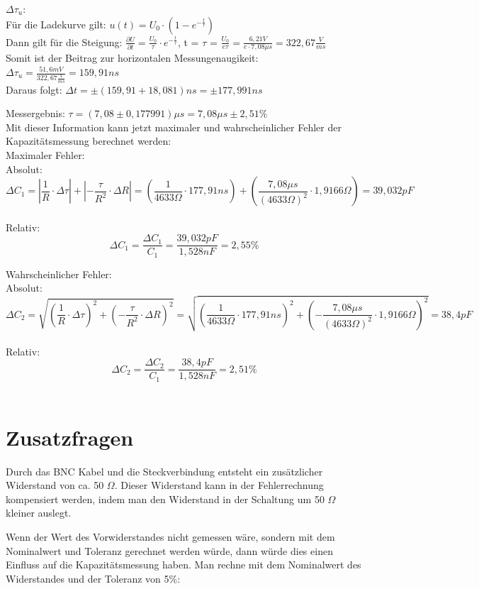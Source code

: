 $\Delta \tau_u$: \\
Für die Ladekurve gilt: $u(t) = U_0 \cdot (1 - e^{-\frac{t}{\tau}})$\\
Dann gilt für die Steigung: $\frac{\partial U}{\partial t} =\frac{U_0}{\tau} \cdot e^{-\frac{t}{\tau}}$, t = $\tau$ = $\frac{U_0}{e\tau} = \frac{6,21V}{e\cdot7,08\mu s} = 322,67\frac{V}{ms}$\\
Somit ist der Beitrag zur horizontalen Messungenaugikeit: $\Delta \tau_u = \frac{51,6mV}{322,67\frac{V}{ms}} = 159,91 ns$\\

Daraus folgt: $\Delta t = \pm (159,91 + 18,081)ns = \pm 177,991 ns$

Messergebnis: $\tau = (7,08 \pm 0,177991) \mu s = 7,08 \mu s \pm 2,51\%$\\

Mit dieser Information kann jetzt maximaler und wahrscheinlicher Fehler der Kapazitätsmessung berechnet werden:\\
Maximaler Fehler:\\ 
Absolut: 
\[
	\Delta C_{1} = |\frac{1}{R} \cdot \Delta \tau| + |- \frac{\tau}{R^2} \cdot \Delta R| = 
	(\frac{1}{4633 \Omega} \cdot 177,91 ns) + (\frac{7,08 \mu s}{(4633 \Omega)^2} \cdot 1,9166 \Omega)
	= 39,032 pF
\]\\
Relativ: 
\[
	\Delta C_{1} = \frac{\Delta C_{1}}{C_{1}} = \frac{39,032 pF}{1,528 nF} = 2,55\%
\]

Wahrscheinlicher Fehler:\\
Absolut: 
\[
	\Delta C_{2} = \sqrt{(\frac{1}{R} \cdot \Delta \tau)^2 + (- \frac{\tau}{R^2} \cdot \Delta R)^2} =
\sqrt{(\frac{1}{4633 \Omega} \cdot 177,91 ns)^2 + (- \frac{7,08 \mu s}{(4633 \Omega)^2} \cdot 1,9166 \Omega)^2}
= 38,4 pF
\]\\
Relativ: 
\[
	\Delta C_{2} = \frac{\Delta C_{2}}{C_{1}} = \frac{38,4 pF}{1,528 nF} = 2,51\%
\]\\


\section{Zusatzfragen}

Durch das BNC Kabel und die Steckverbindung entsteht ein zusätzlicher 
Widerstand von ca. 50 $\Omega$. Dieser Widerstand kann in der Fehlerrechnung
kompensiert werden, indem man den Widerstand in der Schaltung um 50 $\Omega$
kleiner auslegt.

Wenn der Wert des Vorwiderstandes nicht gemessen wäre, sondern mit dem
Nominalwert und Toleranz gerechnet werden würde, dann würde dies einen
Einfluss auf die Kapazitätsmessung haben. Man rechne mit dem Nominalwert
des Widerstandes und der Toleranz von 5\%:

